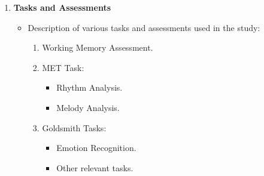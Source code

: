 \begin{enumerate}
    \item \textbf{Tasks and Assessments}
    \begin{itemize}
        \item Description of various tasks and assessments used in the study:
        \begin{enumerate}
            \item Working Memory Assessment.
            \item MET Task:
            \begin{itemize}
                \item Rhythm Analysis.
                \item Melody Analysis.
            \end{itemize}
            \item Goldsmith Tasks:
            \begin{itemize}
                \item Emotion Recognition.
                \item Other relevant tasks.
            \end{itemize}
        \end{enumerate}
    \end{itemize}
\end{enumerate}